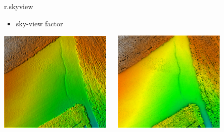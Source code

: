 \documentclass[xcolor={dvipsnames,usenames},beamer,aspectratio=169]{beamer}
\begin{document}
\begin{frame}{r.skyview}

\begin{itemize}
  \item sky-view factor
\end{itemize}

\begin{center}
  \includegraphics[width=0.4\textwidth]{vis/shaded_relief}
  ~~
  \includegraphics[width=0.4\textwidth]{vis/skyview}
\end{center}

\end{frame}
\end{document}
